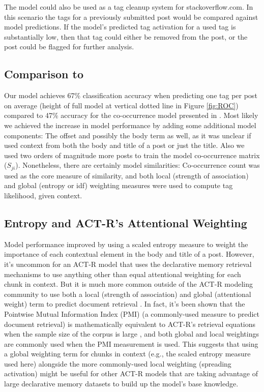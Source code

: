 \documentclass[10pt,letterpaper]{article}
\begin{document}
The model could also be used as a tag cleanup system for stackoverflow.com.
In this scenario the tags for a previously submitted post would be compared against model predictions.
If the model's predicted tag activation for a used tag is substantially low, then that tag could either be removed from the post, or the post could be flagged for further analysis.

\subsection{Comparison to }

Our model achieves 67\% classification accuracy when predicting one tag per post on average
(height of full model at vertical dotted line in Figure \ref{fig:ROC})
compared to 47\% accuracy for the co-occurrence model presented in .
Most likely we achieved the increase in model performance by adding some additional model components:
The offset and possibly the body term as well,
as it was unclear if \citeauthor{Kuo2011} used context from both the body and title of a post or just the title.
Also we used two orders of magnitude more posts to train the model co-occurrence matrix ($S_{ji}$).
Nonetheless, there are certainly model similarities:
Co-occurrence count was used as the core measure of similarity, and both local (strength of association) and global (entropy or idf) weighting measures were used to compute tag likelihood, given context.

\subsection{Entropy and ACT-R's Attentional Weighting}

Model performance improved by using a scaled entropy measure to weight the importance of each contextual element in the body and title of a post.
However, it's uncommon for an ACT-R model that uses the declarative memory retrieval mechanisms to use anything other than equal attentional weighting for each chunk in context.
But it is much more common outside of the ACT-R modeling community to use both a local (strength of association) and global (attentional weight) term to predict document retrieval \cite{Dumais1991}.
In fact, it's been shown that the Pointwise Mutual Information Index (PMI) (a commonly-used measure to predict document retrieval)
is mathematically equivalent to ACT-R's retrieval equations when the sample size of the corpus is large \cite{Budiu2007, Farahat2004},
and both global and local weightings are commonly used when the PMI measurement is used.
This suggests that using a global weighting term for chunks in context (e.g., the scaled entropy measure used here)
alongside the more commonly-used local weighting (spreading activation) might be useful for other ACT-R models that are taking advantage of large declarative memory datasets to build up the model's base knowledge.
\end{document}
